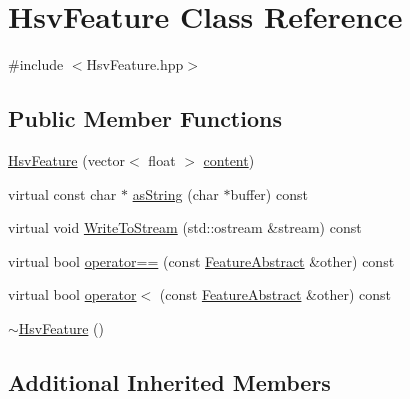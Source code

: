 \hypertarget{class_hsv_feature}{\section{Hsv\+Feature Class Reference}
\label{class_hsv_feature}
}


{\ttfamily \#include $<$Hsv\+Feature.\+hpp$>$}

\subsection*{Public Member Functions}
\begin{DoxyCompactItemize}
\item 
\hyperlink{class_hsv_feature_ae48136e2624bdbee5d6914647dcbf090}{Hsv\+Feature} (vector$<$ float $>$ \hyperlink{class_feature_a4379bdef5cd2e91346a780210c6984d9}{content})
\item 
virtual const char $\ast$ \hyperlink{class_hsv_feature_a1f19df5b9276b025f090ae388586c258}{as\+String} (char $\ast$buffer) const 
\item 
virtual void \hyperlink{class_hsv_feature_a02de6378bb15995c8b889e946daf48fe}{Write\+To\+Stream} (std\+::ostream \&stream) const 
\item 
virtual bool \hyperlink{class_hsv_feature_a83ed51eb1e3de306bb3e792e184cce58}{operator==} (const \hyperlink{class_feature_abstract}{Feature\+Abstract} \&other) const 
\item 
virtual bool \hyperlink{class_hsv_feature_a1b710a93fc5d1c55133280dacb90f702}{operator$<$} (const \hyperlink{class_feature_abstract}{Feature\+Abstract} \&other) const 
\item 
\hyperlink{class_hsv_feature_a781e735c888343b2fe38bb0595e5f77e}{$\sim$\+Hsv\+Feature} ()
\end{DoxyCompactItemize}
\subsection*{Additional Inherited Members}


